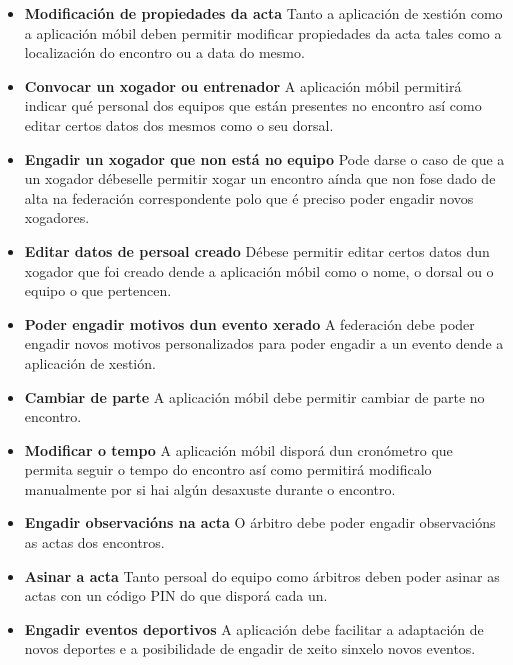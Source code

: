     \begin{itemize}

    \item \textbf{Modificación de propiedades da acta}
    Tanto a aplicación de xestión como a aplicación móbil deben permitir 
modificar propiedades da acta tales como a localización do encontro ou a data 
do mesmo.

    \item \textbf{Convocar un xogador ou entrenador}
    A aplicación móbil permitirá indicar qué personal dos equipos que están 
presentes no encontro así como editar certos datos dos mesmos como o seu dorsal.

    \item \textbf{Engadir un xogador que non está no equipo}
    Pode darse o caso de que a un xogador débeselle permitir xogar un encontro 
aínda que non fose dado de alta na federación correspondente polo que é preciso 
poder engadir novos xogadores.

    \item \textbf{Editar datos de persoal creado}
    Débese permitir editar certos datos dun xogador que foi creado dende 
a aplicación móbil como o nome, o dorsal ou o equipo o que pertencen.

    \item \textbf{Poder engadir motivos dun evento xerado}
    A federación debe poder engadir novos motivos personalizados para poder 
engadir a un evento dende a aplicación de xestión.

    \item \textbf{Cambiar de parte}
    A aplicación móbil debe permitir cambiar de parte no encontro.

    \item \textbf{Modificar o tempo}
    A aplicación móbil disporá dun cronómetro que permita seguir o tempo do 
encontro así como permitirá modificalo manualmente por si hai algún desaxuste 
durante o encontro.

    \item \textbf{Engadir observacións na acta}
    O árbitro debe poder engadir observacións as actas dos encontros.

    \item \textbf{Asinar a acta}
    Tanto persoal do equipo como árbitros deben poder asinar as actas con un 
código PIN do que disporá cada un.

    \item \textbf{Engadir eventos deportivos}
    A aplicación debe facilitar a adaptación de novos deportes e a posibilidade 
de engadir de xeito sinxelo novos eventos.
    
    \end{itemize}

    


